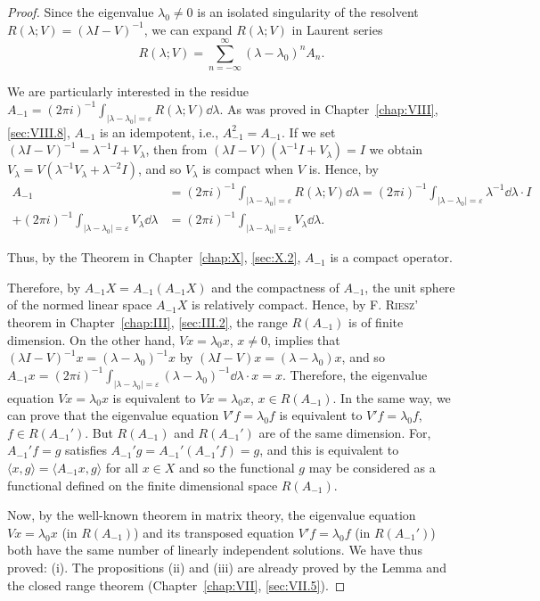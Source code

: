\begin{proof}
 Since the eigenvalue $\lambda_{0} \neq 0$ is an isolated singularity of the resolvent $R(\lambda; V) = (\lambda I - V)^{-1}$, we can expand $R(\lambda; V)$ in Laurent series 
\[
R (\lambda ; V) = \sum\limits_{n = - \infty} ^{\infty} (\lambda - \lambda_{0}) ^{n} A _{n}. \]

We are particularly interested in the residue $A_{-1} = (2\pi i)^{-1} \int_{|\lambda - \lambda_0| = \varepsilon} R(\lambda; V) \dd\lambda$. As was proved in Chapter~\ref{chap:VIII}, \ref{sec:VIII.8}, $A_{-1}$ is an idempotent, i.e., $A_{-1}^2 = A_{-1}$. If we set $(\lambda I - V)^{-1} = \lambda^{-1}I + V_\lambda$, then from $(\lambda I - V)(\lambda^{-1}I + V_\lambda) = I$ we obtain $V_\lambda = V(\lambda^{-1}V_\lambda + \lambda^{-2}I)$, and so $V_\lambda$ is compact when $V$ is. Hence, by 
\[
\begin{aligned}
A _{-1} &= (2 \pi i) ^{-1} \int_ {| \lambda - \lambda_{0} | = \varepsilon} R (\lambda ; V) \dd \lambda = (2 \pi i) ^{-1} \int_ {| \lambda - \lambda_{0} | = \varepsilon} \lambda^{-1} \dd \lambda \cdot I
\\
+ (2 \pi i) ^{-1} \int_ {| \lambda - \lambda_{0} | = \varepsilon} V _{\lambda} \dd \lambda &= (2 \pi i) ^{-1} \int_ {| \lambda - \lambda_{0} | = \varepsilon} V _{\lambda} \dd \lambda .
\end{aligned}
\]

Thus, by the Theorem in Chapter~\ref{chap:X}, \ref{sec:X.2}, $A_{-1}$ is a compact operator. 

Therefore, by $A_{-1}X = A_{-1}(A_{-1}X)$ and the compactness of $A_{-1}$, the unit sphere of the normed linear space $A_{-1}X$ is relatively compact. Hence, by F. \textsc{Riesz}' theorem in Chapter~\ref{chap:III}, \ref{sec:III.2}, the range $R(A_{-1})$ is of finite dimension. On the other hand, $Vx = \lambda_0x$, $x \neq 0$, implies that $(\lambda I - V)^{-1}x = (\lambda - \lambda_0)^{-1}x$ by $(\lambda I - V)x = (\lambda - \lambda_0)x$, and so $A_{-1}x = (2\pi i)^{-1}\int_{|\lambda - \lambda_0| = \varepsilon}(\lambda - \lambda_0)^{-1}\dd\lambda \cdot x = x$. Therefore, the eigenvalue equation $Vx = \lambda_0x$ is equivalent to $Vx = \lambda_0x$, $x \in R(A_{-1})$. In the same way, we can prove that the eigenvalue equation $V'f = \lambda_0f$ is equivalent to $V'f = \lambda_0f$, $f \in R(A_{-1}')$. But $R(A_{-1})$ and $R(A_{-1}')$ are of the same dimension. For, $A_{-1}'f = g$ satisfies $A_{-1}'g = A_{-1}'(A_{-1}'f) = g$, and this is equivalent to $\langle x, g \rangle = \langle A_{-1}x, g \rangle$ for all $x \in X$ and so the functional $g$ may be considered as a functional defined on the finite dimensional space $R(A_{-1})$. 

Now, by the well-known theorem in matrix theory, the eigenvalue equation $Vx = \lambda_{0}x$ (in $R(A_{-1})$) and its transposed equation $V'f = \lambda_{0}f$ (in $R(A_{-1}')$) both have the same number of linearly independent solutions. We have thus proved:
 (i). The propositions (ii) and (iii) are already proved by the Lemma and the closed range theorem (Chapter~\ref{chap:VII}, \ref{sec:VII.5}).
\end{proof}

